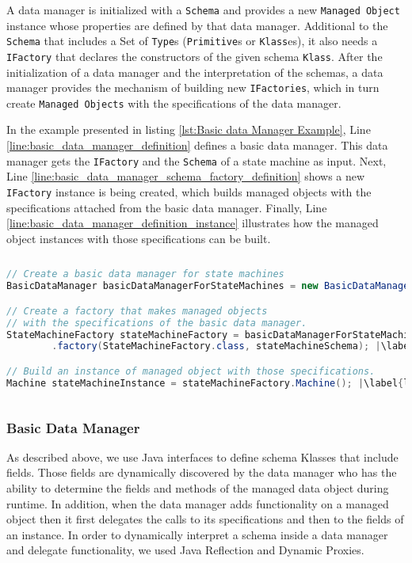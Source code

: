 A data manager is initialized with a \texttt{Schema} and provides a new \texttt{Managed Object} instance whose properties are defined by that data manager.
Additional to the \texttt{Schema} that includes a Set of \texttt{Type}s (\texttt{Primitive}s or \texttt{Klass}es), it also needs a \texttt{IFactory} that declares the constructors of the given schema \texttt{Klass}.
After the initialization of a data manager and the interpretation of the schemas, a data manager provides the mechanism of building new \texttt{IFactories}, which in turn create \texttt{Managed Objects} with the specifications of the data manager.

In the example presented in listing \ref{lst:Basic data Manager Example}, Line \ref{line:basic_data_manager_definition} defines a basic data manager.
This data manager gets the \texttt{IFactory} and the \texttt{Schema} of a state machine as input. 
Next, Line \ref{line:basic_data_manager_schema_factory_definition} shows a new \texttt{IFactory} instance is being created, which builds managed objects with the specifications attached from the basic data manager.
Finally, Line \ref{line:basic_data_manager_definition_instance} illustrates how the managed object instances with those specifications can be built.

\begin{sourcecode} [H]
	\begin{lstlisting}[language=Java, escapechar=|]
// Create a basic data manager for state machines
BasicDataManager basicDataManagerForStateMachines = new BasicDataManager(); |\label{line:basic_data_manager_definition}|

// Create a factory that makes managed objects 
// with the specifications of the basic data manager.
StateMachineFactory stateMachineFactory = basicDataManagerForStateMachines
		.factory(StateMachineFactory.class, stateMachineSchema); |\label{line:basic_data_manager_schema_factory_definition}|

// Build an instance of managed object with those specifications.
Machine stateMachineInstance = stateMachineFactory.Machine(); |\label{line:basic_data_manager_definition_instance}|
	\end{lstlisting}
	\caption{Basic data Manager Example}
	\label{lst:Basic data Manager Example}
\end{sourcecode}

\subsubsection{Basic Data Manager}
As described above, we use Java interfaces to define schema Klasses that include fields. 
Those fields are dynamically discovered by the data manager who has the ability to determine the fields and methods of the managed data object during runtime.
In addition, when the data manager adds functionality on a managed object then it first delegates the calls to its specifications and then to the fields of an instance.
In order to dynamically interpret a schema inside a data manager and delegate functionality, we used Java Reflection and Dynamic Proxies.

